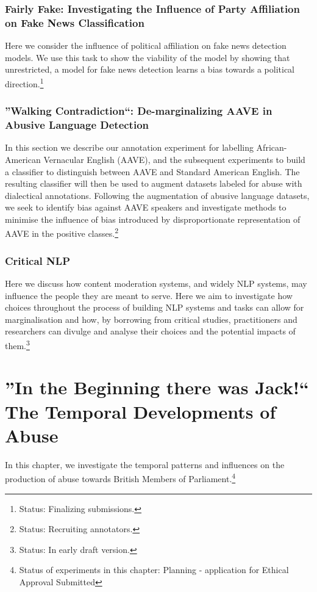 \subsubsection{Fairly Fake: Investigating the Influence of Party Affiliation on Fake News Classification}
Here we consider the influence of political affiliation on fake news detection models. We use this task to show the viability of the model by showing that unrestricted, a model for fake news detection learns a bias towards a political direction.\footnote{Status: Finalizing submissions.}

\subsubsection{''Walking Contradiction``: De-marginalizing AAVE in Abusive Language Detection}
In this section we describe our annotation experiment for labelling African-American Vernacular English (AAVE), and the subsequent experiments to build a classifier to distinguish between AAVE and Standard American English. The resulting classifier will then be used to augment datasets labeled for abuse with dialectical annotations. Following the augmentation of abusive language datasets, we seek to identify bias against AAVE speakers and investigate methods to minimise the influence of bias introduced by disproportionate representation of AAVE in the positive classes.\footnote{Status: Recruiting annotators.}

\subsubsection{Critical NLP}
Here we discuss how content moderation systems, and widely NLP systems, may influence the people they are meant to serve. Here we aim to investigate how choices throughout the process of building NLP systems and tasks can allow for marginalisation and how, by borrowing from critical studies, practitioners and researchers can divulge and analyse their choices and the potential impacts of them.\footnote{Status: In early draft version.}

\section{''In the Beginning there was Jack!`` The Temporal Developments of Abuse}

In this chapter, we investigate the temporal patterns and influences on the production of abuse towards British Members of Parliament.\footnote{Status of experiments in this chapter: Planning - application for Ethical Approval Submitted}

